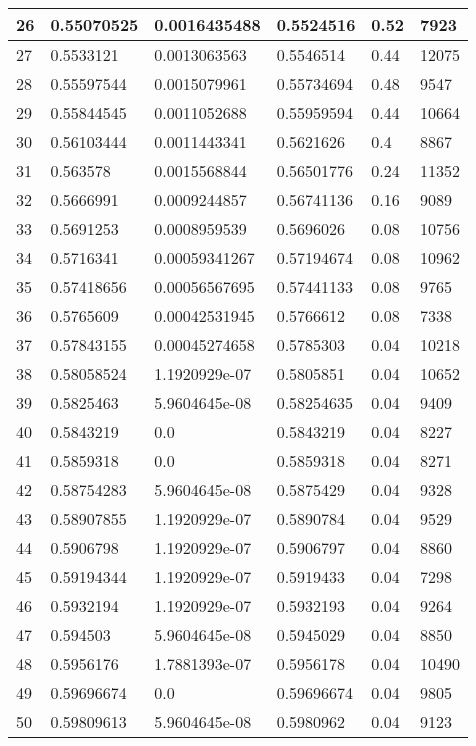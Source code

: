 \begin{longtable}{|l|l|l|l|l|l|}
26 & 0.55070525 & 0.0016435488 & 0.5524516 & 0.52 & 7923 \\ \hline 
27 & 0.5533121 & 0.0013063563 & 0.5546514 & 0.44 & 12075 \\ \hline 
28 & 0.55597544 & 0.0015079961 & 0.55734694 & 0.48 & 9547 \\ \hline 
29 & 0.55844545 & 0.0011052688 & 0.55959594 & 0.44 & 10664 \\ \hline 
30 & 0.56103444 & 0.0011443341 & 0.5621626 & 0.4 & 8867 \\ \hline 
31 & 0.563578 & 0.0015568844 & 0.56501776 & 0.24 & 11352 \\ \hline 
32 & 0.5666991 & 0.0009244857 & 0.56741136 & 0.16 & 9089 \\ \hline 
33 & 0.5691253 & 0.0008959539 & 0.5696026 & 0.08 & 10756 \\ \hline 
34 & 0.5716341 & 0.00059341267 & 0.57194674 & 0.08 & 10962 \\ \hline 
35 & 0.57418656 & 0.00056567695 & 0.57441133 & 0.08 & 9765 \\ \hline 
36 & 0.5765609 & 0.00042531945 & 0.5766612 & 0.08 & 7338 \\ \hline 
37 & 0.57843155 & 0.00045274658 & 0.5785303 & 0.04 & 10218 \\ \hline 
38 & 0.58058524 & 1.1920929e-07 & 0.5805851 & 0.04 & 10652 \\ \hline 
39 & 0.5825463 & 5.9604645e-08 & 0.58254635 & 0.04 & 9409 \\ \hline 
40 & 0.5843219 & 0.0 & 0.5843219 & 0.04 & 8227 \\ \hline 
41 & 0.5859318 & 0.0 & 0.5859318 & 0.04 & 8271 \\ \hline 
42 & 0.58754283 & 5.9604645e-08 & 0.5875429 & 0.04 & 9328 \\ \hline 
43 & 0.58907855 & 1.1920929e-07 & 0.5890784 & 0.04 & 9529 \\ \hline 
44 & 0.5906798 & 1.1920929e-07 & 0.5906797 & 0.04 & 8860 \\ \hline 
45 & 0.59194344 & 1.1920929e-07 & 0.5919433 & 0.04 & 7298 \\ \hline 
46 & 0.5932194 & 1.1920929e-07 & 0.5932193 & 0.04 & 9264 \\ \hline 
47 & 0.594503 & 5.9604645e-08 & 0.5945029 & 0.04 & 8850 \\ \hline 
48 & 0.5956176 & 1.7881393e-07 & 0.5956178 & 0.04 & 10490 \\ \hline 
49 & 0.59696674 & 0.0 & 0.59696674 & 0.04 & 9805 \\ \hline 
50 & 0.59809613 & 5.9604645e-08 & 0.5980962 & 0.04 & 9123 \\ \hline 

\end{longtable}
